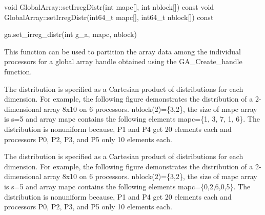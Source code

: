 \documentclass[12pt]{article}
\begin{document}
\begin{cxxapi}
\begin{cxxcode}
void GlobalArray::setIrregDistr(int mapc[], int nblock[]) const
void GlobalArray::setIrregDistr(int64_t mapc[], int64_t nblock[]) const
\end{cxxcode}
\begin{funcargs}
\end{funcargs}
\end{cxxapi}

\begin{pyapi}
\begin{pycode}
ga.set_irreg_distr(int g_a, mapc, nblock)
\end{pycode}
\begin{funcargs}
\end{funcargs}
\end{pyapi}

\gcoll

\begin{desc}

This function can be used to partition the array data among the individual
processors for a global array handle obtained using the GA_Create_handle
function.
\end{desc}

\begin{fdesc}
The distribution is specified as a Cartesian product of distributions for each
dimension. For example, the following figure demonstrates the distribution of a
2-dimensional array 8x10 on 6 processors. nblock(2)=\{3,2\}, the size
of mapc array is s=5 and array mapc contains the following elements mapc=\{1,
3, 7, 1, 6\}. The distribution is nonuniform because, P1 and P4 get 20 elements
each and processors P0, P2, P3, and P5 only 10 elements each.
\end{fdesc}

\begin{cdesc}
The distribution is specified as a Cartesian product of distributions for each
dimension. For example, the following figure demonstrates the distribution of a
2-dimensional array 8x10 on 6 processors. nblock(2)=\{3,2\}, the size
of mapc array is s=5 and array mapc contains the following elements
mapc=\{0,2,6,0,5\}. The distribution is nonuniform because, P1 and P4 get 20
elements each and processors P0, P2, P3, and P5 only 10 elements each.
\end{cdesc}
\end{document}
